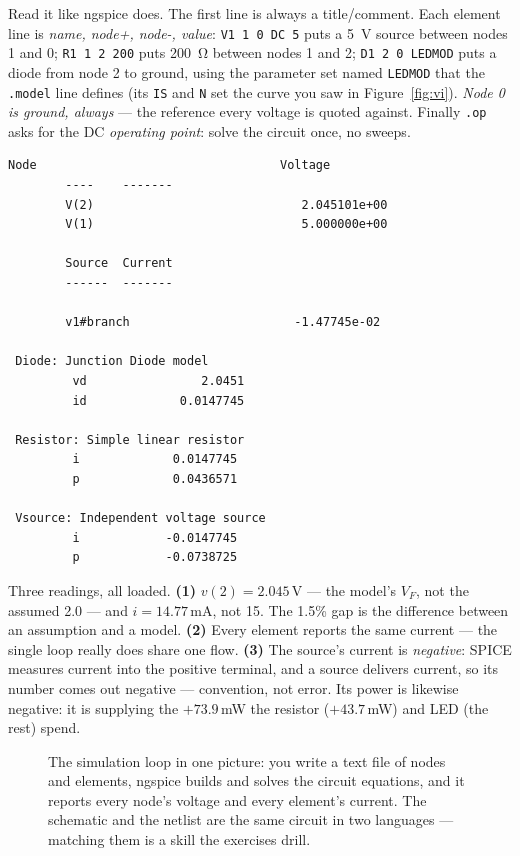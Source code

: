 Read it like ngspice does. The first line is always a title/comment. Each
element line is \emph{name, node+, node-, value}: \texttt{V1 1 0 DC 5} puts a
\qty{5}{\volt} source between nodes 1 and 0; \texttt{R1 1 2 200} puts
\qty{200}{\ohm} between nodes 1 and 2; \texttt{D1 2 0 LEDMOD} puts a diode
from node 2 to ground, using the parameter set named \texttt{LEDMOD} that the
\texttt{.model} line defines (its \texttt{IS} and \texttt{N} set the curve you
saw in Figure~\ref{fig:vi}). \emph{Node 0 is ground, always} — the reference
every voltage is quoted against. Finally \texttt{.op} asks for the DC
\emph{operating point}: solve the circuit once, no
sweeps.

\begin{lstlisting}[language={},numbers=none,caption={Real output of
\texttt{ngspice -b code/ch02\_led.cir} (model parameter tables omitted; the
numbers shown are verbatim). Three things to find: the LED's actual $V_F$,
the loop current, and the sign of the source current.},label={lst:ledop}]
        Node                                  Voltage
        ----    -------
        V(2)                             2.045101e+00
        V(1)                             5.000000e+00

        Source  Current
        ------  -------

        v1#branch                       -1.47745e-02

 Diode: Junction Diode model
         vd                2.0451
         id             0.0147745

 Resistor: Simple linear resistor
         i             0.0147745
         p             0.0436571

 Vsource: Independent voltage source
         i            -0.0147745
         p            -0.0738725
\end{lstlisting}

Three readings, all loaded. \textbf{(1)} $v(2)=2.045$\,V — the model's $V_F$,
not the assumed 2.0 — and $i = 14.77$\,mA, not 15. The 1.5\% gap is the
difference between an assumption and a model. \textbf{(2)} Every element
reports the same current — the single loop really does share one flow.
\textbf{(3)} The source's current is \emph{negative}: SPICE measures current
into the positive terminal, and a source delivers current, so its number
comes out negative — convention, not error. Its power is likewise negative:
it is supplying the $+73.9$\,mW the resistor ($+43.7$\,mW) and LED (the
rest) spend.

\begin{figure}[htbp]
\centering

\caption{The simulation loop in one picture: you write a text file of nodes
and elements, ngspice builds and solves the circuit equations, and it reports
every node's voltage and every element's current. The schematic and the
netlist are the same circuit in two languages — matching them is a skill the
exercises drill.}
\label{fig:flow}
\end{figure}

